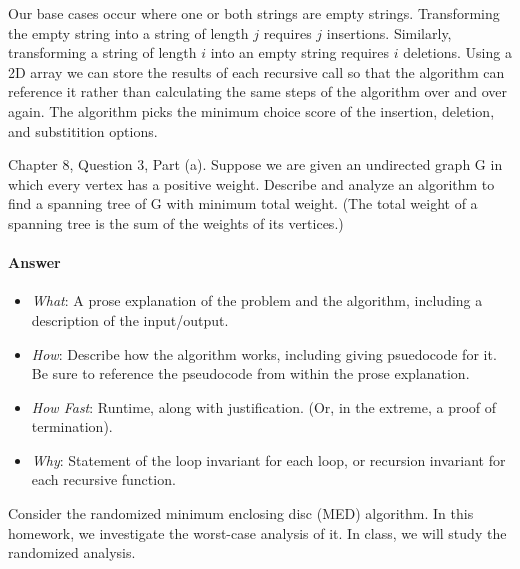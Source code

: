 \documentclass{article}
\begin{document}
\begin{enumerate}
Our base cases occur where one or both strings are empty strings. Transforming the empty string into a string of length $j$ requires $j$ insertions. Similarly, transforming a string of length $i$ into an empty string requires $i$ deletions. Using a 2D array we can store the results of each recursive call so that the algorithm can reference it rather than calculating the same steps of the algorithm over and over again. The algorithm picks the minimum choice score of the insertion, deletion, and substitition options. 

\end{enumerate}


\nextprob{}

Chapter 8, Question 3, Part (a). Suppose we are given an undirected graph G in which every vertex has a positive weight. Describe and analyze an algorithm to find a spanning tree of G with minimum total weight. (The total weight of a spanning tree is the sum
of the weights of its vertices.)

\paragraph{Answer}
\begin{itemize}
            \item \emph{What}: 
A prose explanation of the problem and the algorithm,
                including a description of the input/output.
            \item \emph{How}: Describe how the algorithm works, including giving
                psuedocode for it.  Be sure to reference the pseudocode
                from within the prose explanation.
            \item \emph{How Fast}: Runtime, along with justification.  (Or, in the
                extreme, a proof of termination).
            \item \emph{Why}: Statement of the loop invariant for each loop, or
                recursion invariant for each recursive function.
        \end{itemize}

Consider the randomized minimum enclosing disc (MED) algorithm.  In this
homework, we investigate the worst-case analysis of it.  In class, we will study
the randomized analysis.
\end{document}
